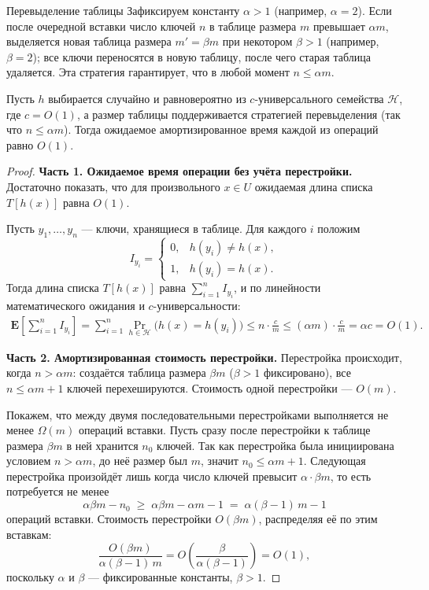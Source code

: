 \begin{Statement}{Перевыделение таблицы}{}
	Зафиксируем константу $\alpha > 1$ (например, $\alpha = 2$). Если после очередной вставки число ключей $n$ в таблице размера $m$ превышает $\alpha m$, выделяется новая таблица размера $m' = \beta m$ при некотором $\beta > 1$ (например, $\beta = 2$); все ключи переносятся в новую таблицу, после чего старая таблица удаляется. Эта стратегия гарантирует, что в любой момент $n \leq \alpha m$.
\end{Statement}

\begin{Theorem}{}{}
	Пусть $h$ выбирается случайно и равновероятно из $c$-универсального семейства $\mathcal{H}$, где $c = O(1)$, а размер таблицы поддерживается стратегией перевыделения (так что $n \leq \alpha m$). Тогда ожидаемое амортизированное время каждой из операций равно $O(1)$.
\end{Theorem}

\begin{proof}
	\textbf{Часть 1. Ожидаемое время операции без учёта перестройки.}
	Достаточно показать, что для произвольного $x \in U$ ожидаемая длина списка $T[h(x)]$ равна $O(1)$.
	
	Пусть $y_1,\ldots,y_n$ --- ключи, хранящиеся в таблице. Для каждого $i$ положим
	\[
	I_{y_i} =
	\begin{cases}
		0, & h(y_i) \neq h(x),\\
		1, & h(y_i) = h(x).
	\end{cases}
	\]
	Тогда длина списка $T[h(x)]$ равна $\sum_{i=1}^{n} I_{y_i}$, и по линейности математического ожидания и $c$-универсальности:
	\begin{align*}
		\mathbf{E}\!\left[\sum_{i=1}^{n} I_{y_i}\right]
		= \sum_{i=1}^{n} \Pr_{h \in \mathcal{H}}\bigl(h(x) = h(y_i)\bigr)
		\leq n \cdot \frac{c}{m}
		\leq (\alpha m) \cdot \frac{c}{m}
		= \alpha c = O(1).
	\end{align*}
	
	\textbf{Часть 2. Амортизированная стоимость перестройки.}
	Перестройка происходит, когда $n > \alpha m$: создаётся таблица размера $\beta m$ ($\beta > 1$ фиксировано), все $n \leq \alpha m + 1$ ключей перехешируются. Стоимость одной перестройки --- $O(m)$.
	
	Покажем, что между двумя последовательными перестройками выполняется не менее $\Omega(m)$ операций вставки. Пусть сразу после перестройки к таблице размера $\beta m$ в ней хранится $n_0$ ключей. Так как перестройка была инициирована условием $n > \alpha m$, до неё размер был $m$, значит $n_0 \leq \alpha m + 1$. Следующая перестройка произойдёт лишь когда число ключей превысит $\alpha \cdot \beta m$, то есть потребуется не менее
	\[
	\alpha \beta m - n_0 \;\geq\; \alpha \beta m - \alpha m - 1 \;=\; \alpha(\beta - 1)\,m - 1
	\]
	операций вставки. Стоимость перестройки $O(\beta m)$, распределяя её по этим вставкам:
	\[
	\frac{O(\beta m)}{\alpha(\beta-1)\,m} = O\!\left(\frac{\beta}{\alpha(\beta-1)}\right) = O(1),
	\]
	поскольку $\alpha$ и $\beta$ --- фиксированные константы, $\beta > 1$.
\end{proof}